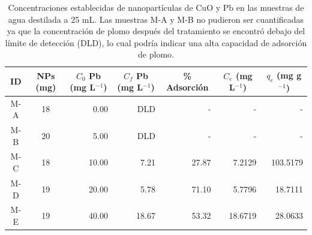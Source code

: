 \documentclass[fleqn,10pt]{SelfArx} %
\begin{document}
\begin{table}[ht!]
\centering
\caption{Concentraciones establecidas de nanopartículas de CuO y Pb en las muestras de agua destilada a 25 mL. Las muestras M-A y M-B no pudieron ser cuantificadas ya que la concentración de plomo después del tratamiento se encontró debajo del límite de detección (DLD), lo cual podría indicar una alta capacidad de adsorción de plomo.\\}

    \begin{tabular}{c|crrrr|r}
    
        \toprule
        \textbf{ID} & \textbf{NPs (mg)} & \multicolumn{1}{c}{\textbf{$C_0$ Pb (mg L$^{-1}$)}} & \multicolumn{1}{c}{\textbf{$C_f$ Pb (mg L$^{-1}$)}} & \multicolumn{1}{c}{\textbf{\% Adsorción}} & \multicolumn{1}{c}{\textbf{$C_e$ (mg L$^{-1}$)}} & \multicolumn{1}{c}{\textbf{$q_e$ (mg g$^{-1}$)}} \\
        \midrule
        M-A         & 18                & 0.00                                                     & DLD                                                      & -                                        & -                                                & -                                                \\
        M-B         & 20                & 5.00                                                     & DLD                                                      & -                                        & -                                                & -                                                \\
        M-C         & 18                & 10.00                                                    & 7.21                                                     & 27.87                                    & 7.2129                                           & 103.5179                                         \\
        M-D         & 19                & 20.00                                                    & 5.78                                                     & 71.10                                    & 5.7796                                           & 18.7111                                          \\
        M-E         & 19                & 40.00                                                    & 18.67                                                    & 53.32                                    & 18.6719                                          & 28.0633                                          \\

\end{tabular}
\end{table}
\end{document}
